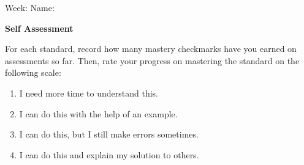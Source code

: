 \documentclass[letterpaper]{article}
\begin{document}
 Week: \underline{\phantom{xxxxxxxxxxxxxxxxx}} \hfill
  Name: \underline{\phantom{xxxxxxxxxxxxxxxxxxxxxxxxxxxxxxxxxxxx}}\\

\begin{center}
{\Large \bf Self Assessment} \\
\end{center}
	

For each standard, record how many mastery checkmarks have you earned on assessments so far.  Then, rate your progress on mastering the standard on the following scale:
\begin{multicols}{2}
\begin{enumerate}[1.]
\item I need more time to understand this.
\item I can do this with the help of an example.
\item I can do this, but I still make errors sometimes.
\item I can do this and explain my solution to others.
\end{enumerate}
\end{multicols}


\setlength{\extrarowheight}{9pt}
\end{document}
